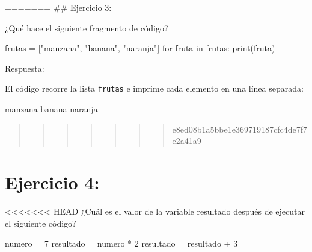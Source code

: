 \documentclass[
  a4paper,
  onepage,
  openany]{scrreprt}
\newenvironment{Shaded}{\begin{snugshade}}{\end{snugshade}}
\newcommand{\BuiltInTok}[1]{\textcolor[rgb]{0.00,0.23,0.31}{#1}}
\newcommand{\ControlFlowTok}[1]{\textcolor[rgb]{0.00,0.23,0.31}{#1}}
\newcommand{\DecValTok}[1]{\textcolor[rgb]{0.68,0.00,0.00}{#1}}
\newcommand{\KeywordTok}[1]{\textcolor[rgb]{0.00,0.23,0.31}{#1}}
\newcommand{\NormalTok}[1]{\textcolor[rgb]{0.00,0.23,0.31}{#1}}
\newcommand{\OperatorTok}[1]{\textcolor[rgb]{0.37,0.37,0.37}{#1}}
\newcommand{\StringTok}[1]{\textcolor[rgb]{0.13,0.47,0.30}{#1}}
\begin{document}
======= \#\# Ejercicio 3:

¿Qué hace el siguiente fragmento de código?

\begin{Shaded}
\begin{Highlighting}[]
\NormalTok{frutas }\OperatorTok{=}\NormalTok{ [}\StringTok{"manzana"}\NormalTok{, }\StringTok{"banana"}\NormalTok{, }\StringTok{"naranja"}\NormalTok{]}
\ControlFlowTok{for}\NormalTok{ fruta }\KeywordTok{in}\NormalTok{ frutas:}
    \BuiltInTok{print}\NormalTok{(fruta)}
\end{Highlighting}
\end{Shaded}

Respuesta:

El código recorre la lista \texttt{frutas} e imprime cada elemento en
una línea separada:

\begin{Shaded}
\begin{Highlighting}[]
\NormalTok{manzana}
\NormalTok{banana}
\NormalTok{naranja}
\end{Highlighting}
\end{Shaded}

\begin{quote}
\begin{quote}
\begin{quote}
\begin{quote}
\begin{quote}
\begin{quote}
\begin{quote}
e8ed08b1a5bbe1e369719187cfc4de7f7e2a41a9
\end{quote}
\end{quote}
\end{quote}
\end{quote}
\end{quote}
\end{quote}
\end{quote}

\hypertarget{ejercicio-4}{%
\chapter{Ejercicio 4:}\label{ejercicio-4}}

\textless\textless\textless\textless\textless\textless\textless{} HEAD
¿Cuál es el valor de la variable resultado después de ejecutar el
siguiente código?

\begin{Shaded}
\begin{Highlighting}[]
\NormalTok{numero }\OperatorTok{=} \DecValTok{7}
\NormalTok{resultado }\OperatorTok{=}\NormalTok{ numero }\OperatorTok{*} \DecValTok{2}
\NormalTok{resultado }\OperatorTok{=}\NormalTok{ resultado }\OperatorTok{+} \DecValTok{3}
\end{Highlighting}
\end{Shaded}
\end{document}
